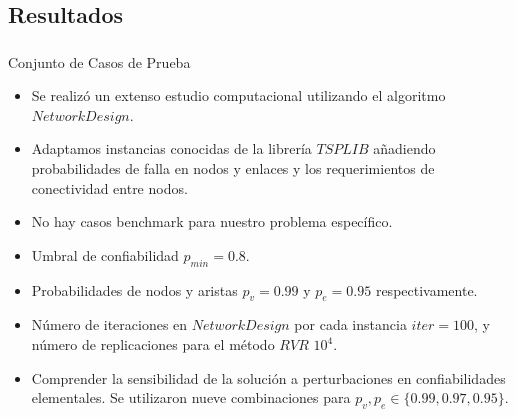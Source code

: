 \subsection{Resultados}
\begin{frame}\frametitle{}
\begin{block}{Conjunto de Casos de Prueba}
\begin{small}
\begin{itemize}
 \item Se realizó un extenso estudio computacional utilizando el algoritmo $NetworkDesign$.
 \item Adaptamos instancias conocidas de la librería $TSPLIB$ añadiendo probabilidades de falla en nodos y enlaces y los requerimientos de conectividad entre nodos.
  \item No hay casos benchmark para nuestro problema específico.
 \item Umbral de confiabilidad $p_{min}=0.8$.
 \item Probabilidades de nodos y aristas $p_v=0.99$ y $p_e=0.95$ respectivamente.
 \item Número de iteraciones en $NetworkDesign$ por cada instancia $iter=100$, y número de replicaciones para el método $RVR$ $10^4$.
 \item Comprender la sensibilidad de la solución a perturbaciones en confiabilidades elementales. Se utilizaron nueve combinaciones para $p_{v},p_{e} \in \{0.99, 0.97,0.95\}$.
\end{itemize} 
\end{small}
\end{block}
\end{frame}

